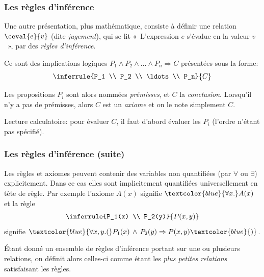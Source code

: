 %
\begin{frame}
\frametitle{Les règles d'inférence}

Une autre présentation, plus mathématique, consiste à définir une
relation $\ceval{e}{v}$ (dite \emph{jugement}), qui se lit
«~L'expression $e$ s'évalue en la valeur $v$~», par des \emph{règles
  d'inférence}.

Ce sont des implications logiques $P_1 \wedge P_2 \wedge \ldots
\wedge P_n \Rightarrow C$ présentées sous la forme:
\[
\inferrule
  {P_1 \\ P_2 \\ \ldots \\ P_n}
  {C}
\]

Les propositions $P_i$ sont alors nommées \emph{prémisses}, et $C$ la
\emph{conclusion}. Lorsqu'il n'y a pas de prémisses, alors $C$ est un
\emph{axiome} et on le note simplement $C$.

Lecture calculatoire: pour évaluer $C$, il faut d'abord évaluer les
$P_i$ (l'ordre n'étant pas spécifié).

\end{frame}

%
\begin{frame}
\frametitle{Les règles d'inférence (suite)}

Les règles et axiomes peuvent contenir des variables non quantifiées
(par $\forall$ ou $\exists$) explicitement. Dans ce cas elles sont
implicitement quantifiées universellement en tête de règle. Par exemple
l'axiome $A(x)$ signifie $\textcolor{blue}{\forall x.}A(x)$ et la règle
\[
\inferrule
  {P_1(x) \\ P_2(y)}
  {P(x,y)}
\]
signifie $\textcolor{blue}{\forall x,y.(}P_1(x) \, \wedge \, P_2(y) \Rightarrow
P(x,y)\textcolor{blue}{)}$.

Étant donné un ensemble de règles d'inférence portant sur une ou
plusieurs relations, on définit alors celles-ci comme étant les
\emph{plus petites relations} satisfaisant les règles.

\end{frame}

